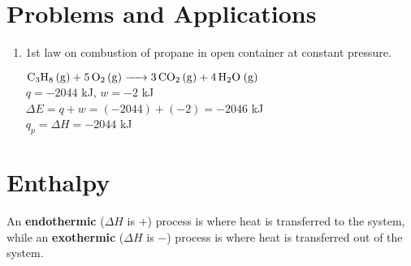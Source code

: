 \documentclass{article}
\begin{document}
\section{Problems and Applications}
\begin{enumerate}
    \item 1st law on combustion of propane in open container at constant
    pressure.
    \begin{center}
        $\ce{C3H8 (g) + 5O2 (g) -> 3CO2 (g) + 4H2O (g)}$\\
        $q = -2044$ kJ,
        $w = -2$ kJ \\
        $\Delta{E} = q + w = (-2044) + (-2) = -2046$ kJ\\
        $q_p = \Delta{H} = -2044$ kJ
    \end{center}
\end{enumerate}
\section{Enthalpy}
An \textbf{endothermic} ($\Delta{H}$ is $+$) process is where heat is transferred to the system,
while an \textbf{exothermic} ($\Delta{H}$ is $-$) process is where heat is transferred out of 
the system. 
\end{document}
